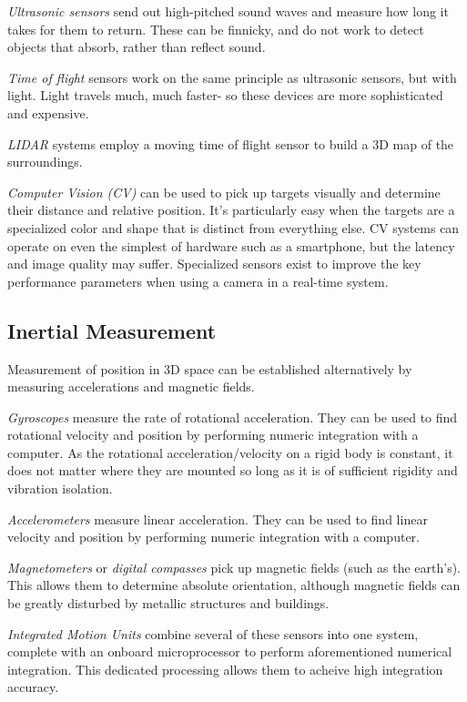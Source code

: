 \begin{asparaenum}[a)]
\item \textit{Ultrasonic sensors} send out high-pitched sound waves and measure how long it takes for them to return. These can be finnicky, and do not work to detect objects that absorb, rather than reflect sound.
\item \textit{Time of flight} sensors work on the same principle as ultrasonic sensors, but with light. Light travels much, much faster- so these devices are more sophisticated and expensive.
\item \textit{LIDAR} systems employ a moving time of flight sensor to build a 3D map of the surroundings.
\item \textit{Computer Vision (CV)} can be used to pick up targets visually and determine their distance and relative position. It's particularly easy when the targets are a specialized color and shape that is distinct from everything else. CV systems can operate on even the simplest of hardware such as a smartphone, but the latency and image quality may suffer. Specialized sensors exist to improve the key performance parameters when using a camera in a real-time system.
\end{asparaenum}

\subsection{Inertial Measurement}
Measurement of position in 3D space can be established alternatively by measuring accelerations and magnetic fields.

\begin{asparaenum}[a)]
\item \textit{Gyroscopes} measure the rate of rotational acceleration. They can be used to find rotational velocity and position by performing numeric integration with a computer. As the rotational acceleration/velocity on a rigid body is constant, it does not matter where they are mounted so long as it is of sufficient rigidity and vibration isolation.
\item \textit{Accelerometers} measure linear acceleration. They can be used to find linear velocity and position by performing numeric integration with a computer.
\item \textit{Magnetometers} or \textit{digital compasses} pick up magnetic fields (such as the earth's). This allows them to determine absolute orientation, although magnetic fields can be greatly disturbed by metallic structures and buildings.
\item \textit{Integrated Motion Units} combine several of these sensors into one system, complete with an onboard microprocessor to perform aforementioned numerical integration. This dedicated processing allows them to acheive high integration accuracy.
\end{asparaenum}


